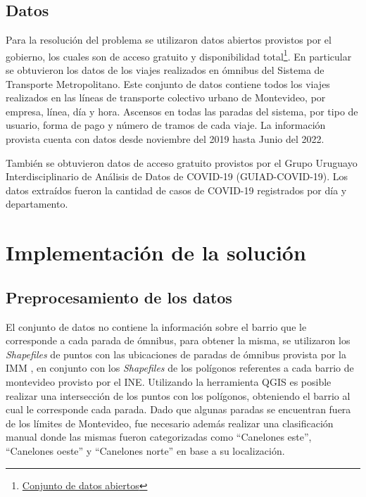 \documentclass[conference]{IEEEtran}
\begin{document}
\subsection{Datos}

Para la resolución del problema se utilizaron datos abiertos provistos por el gobierno, los cuales son de acceso gratuito y disponibilidad total\footnote{\href{https://catalogodatos.gub.uy/}{Conjunto de datos abiertos}}. En particular se obtuvieron los datos de los viajes realizados en ómnibus del Sistema de Transporte Metropolitano\cite{b1}. Este conjunto de datos contiene todos los viajes realizados en las líneas de transporte colectivo urbano de Montevideo, por empresa, línea, día y hora. Ascensos en todas las paradas del sistema, por tipo de usuario, forma de pago y número de tramos de cada viaje. La información provista cuenta con datos desde noviembre del 2019 hasta Junio del 2022.

También se obtuvieron datos de acceso gratuito provistos por el Grupo Uruguayo Interdisciplinario de Análisis de Datos de COVID‑19 (GUIAD-COVID-19). Los datos extraídos fueron la cantidad de casos de COVID-19 registrados por día y departamento\cite{b3}.

\section{Implementación de la solución}

\subsection{Preprocesamiento de los datos}

El conjunto de datos no contiene la información sobre el barrio que le corresponde a cada parada de ómnibus, para obtener la misma, se utilizaron los \textit{Shapefiles} de puntos con las ubicaciones de paradas de ómnibus provista por la IMM \cite{b2}, en conjunto con los \textit{Shapefiles} de los polígonos referentes a cada barrio de montevideo provisto por el INE\cite{b3}. 
Utilizando la herramienta QGIS \cite{b4} es posible realizar una intersección de los puntos con los polígonos, obteniendo el barrio al cual le corresponde cada parada. Dado que algunas paradas se encuentran fuera de los límites de Montevideo, fue necesario además realizar una clasificación manual donde las mismas fueron categorizadas como ``Canelones este'', ``Canelones oeste'' y ``Canelones norte'' en base a su localización.
\end{document}
